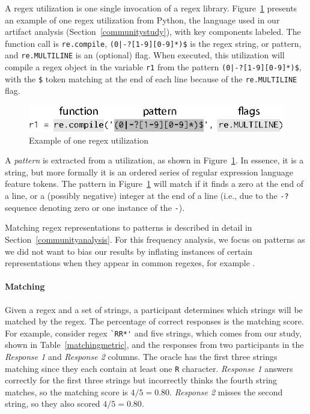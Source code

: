 A regex {utilization} is one single invocation of a regex library.
Figure~\ref{fig:exampleUsage} presents an example of one regex {utilization} from Python, the language used in our artifact analysis (Section~\ref{communitystudy}), with key components labeled. The function call is {\tt re.compile}, \verb!(0|-?[1-9][0-9]*)$! is the regex string, or pattern, and {\tt re.MULTILINE} is an (optional) flag. When executed, this {utilization}  will compile a regex object in the variable {\tt r1} from the pattern \verb!(0|-?[1-9][0-9]*)$!, with the \verb!$! token matching at the end of each line because of the {\tt re.MULTILINE} flag. 

\begin{figure}[tb]
\centering
\includegraphics[width=\columnwidth]{illustrations/exampleUsage.eps}
\vspace{-12pt}
\caption{Example of one regex utilization}
\vspace{-6pt}
\label{fig:exampleUsage}
\end{figure}

A \emph{pattern} is extracted from a utilization, as shown in Figure~\ref{fig:exampleUsage}. In essence, it is a string, but more formally it is an ordered series of regular expression language feature tokens.  The pattern in Figure~\ref{fig:exampleUsage}  will match if it finds a zero at the end of a line, or a (possibly negative) integer at the end of a line (i.e., due to the {\tt -?} sequence denoting zero or one instance of the {\tt -}).

Matching regex representations to patterns is described in detail in Section~\ref{communityanalysis}. 
For this frequency analysis, we focus on patterns as we did not want to bias our results by inflating instances of certain representations when they appear in common regexes, for example . 





\paragraph{Matching}
 Given a regex and a set of strings, a participant determines which strings will be matched by the regex. The percentage of correct responses is the matching score. For example, consider regex \verb!`RR*'! and five strings, which comes from our study, shown in Table~\ref{matchingmetric}, and the responses from two participants in the \emph{Response 1} and \emph{Response 2} columns. The oracle has the first three strings matching since they each contain at least one \verb!R! character. \emph{Response 1} answers correctly for the first three strings but incorrectly thinks the fourth string matches, so the matching score is $4/5 = 0.80$. \emph{Response 2} misses the second string, so they also scored $4/5 = 0.80$. 



